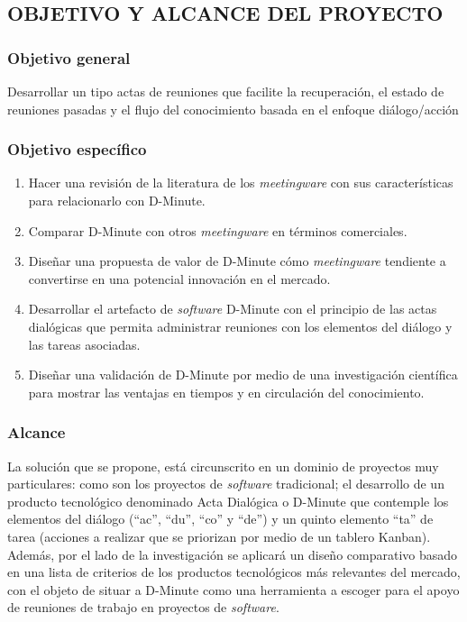 \subsection{OBJETIVO Y ALCANCE DEL PROYECTO}

\subsubsection{Objetivo general}

Desarrollar un tipo actas de reuniones que facilite la recuperación, el estado de reuniones pasadas y el flujo del conocimiento basada en el enfoque diálogo/acción

\subsubsection{Objetivo específico}

\begin{enumerate}[1.]
    \item Hacer una revisión de la literatura de los \textit{meetingware} con sus características para relacionarlo con D-Minute.
    \item Comparar D-Minute con otros \textit{meetingware} en términos comerciales.
    \item Dise\~nar una propuesta de valor de D-Minute cómo \textit{meetingware} tendiente a convertirse en una potencial innovación en el mercado.
	\item Desarrollar el artefacto de \textit{software} D-Minute con el principio de las actas dialógicas que permita administrar reuniones con los elementos del diálogo y las tareas asociadas.
	\item Dise\~nar una validación de D-Minute por medio de una investigación científica para mostrar las ventajas en tiempos y en circulación del conocimiento.
\end{enumerate}

\subsubsection{Alcance}

La solución que se propone, está circunscrito en un dominio de proyectos muy particulares: como son los proyectos de \textit{software} tradicional; el desarrollo de un producto tecnológico denominado Acta Dialógica o D-Minute que contemple los elementos del diálogo (“ac”, “du”, “co” y “de”) y un quinto elemento “ta” de tarea (acciones a realizar que se priorizan por medio de un tablero Kanban). Además, por el lado de la investigación se aplicará un diseño comparativo basado en una lista de criterios de los productos tecnológicos más relevantes del mercado, con el objeto de situar a D-Minute como una herramienta a escoger para el apoyo de reuniones de trabajo en proyectos de \textit{software}.

